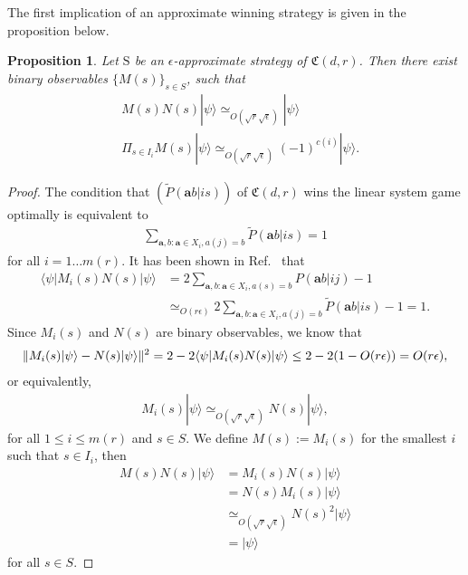 \documentclass[11pt,letterpaper]{article}
\newcommand{\ket}[1]{|#1\rangle}
\newcommand{\bra}[1]{\langle#1|}
\DeclarePairedDelimiter{\norm}{\lVert}{\rVert}
\newcommand{\1}{\mathbb{1}}
\newcommand{\mr}{m(r)}
\newcommand{\fC}{\mathfrak{C}}
\newcommand{\ba}{\pmb{a}}
\newcommand{\bS}{\mathrm{S}}
\newcommand{\pr}[2]{P(#1|#2)}
\newcommand{\tpr}[2]{\tilde{P}(#1|#2)}
\newcommand{\ep}{\epsilon}
\newcommand{\se}{\sqrt{\epsilon}}
\newcommand{\sr}{\sqrt{r}}
\newcommand{\appd}[1]{\simeq_{#1}}
\newtheorem{proposition}[theorem]{Proposition}
\theoremstyle{definition}
\begin{document}
The first implication of an approximate winning strategy is given in the proposition below.
\begin{proposition}
	\label{prop:lct_base}
	Let $\bS$ be an $\ep$-approximate strategy of $\fC(d,r)$.
	Then there exist binary observables $\{ M(s) \}_{s \in S} $, such that
	\begin{align}
		&M(s) N(s) \ket{\psi} \appd{O(\sr\se)} \ket{\psi} \\
		&\Pi_{s \in I_i} M(s) \ket{\psi} \appd{O(\sr\se)}(-1)^{c(i)} \ket{\psi}.
	\end{align}
\end{proposition}
\begin{proof}
The condition that $(\tpr{\ba b}{i s})$ of $\fC(d,r)$ wins the linear system game optimally is equivalent to
\begin{align*}
\sum_{\ba,b: \ba \in X_i, a(j) = b} \tpr{\ba b}{is} = 1
\end{align*}
for all $i = 1 \dots \mr$.
It has been shown in Ref.~\cite{slofstra2017} that 
\begin{align*}
	\bra{\psi} M_i(s) N(s) \ket{\psi} &= 2 \sum_{\ba,b: \ba \in X_i, a(s) = b} \pr{\ba b}{ij} -1 \\
	&\appd{O(r \ep)} 2\sum_{\ba,b: \ba \in X_i, a(j) = b} \tpr{\ba b}{is} - 1 = 1.
\end{align*}
Since $M_i(s)$ and $N(s)$ are binary observables, we know that
\begin{align*}
    \norm{M_i(s)\ket{\psi} - N(s)\ket{\psi}}^2 
    = 2 - 2 \bra{\psi}M_i(s)N(s) \ket{\psi} 
    \leq 2 - 2(1 - O(r\ep)) = O(r\ep),
\end{align*}
or equivalently,
\begin{align*}
	M_{i}(s) \ket{\psi} \appd{O(\sr\se)} N(s) \ket{\psi},
\end{align*}
for all $1 \leq i \leq \mr$ and $s \in S$.
We define $M(s) := M_{i}(s)$ for the smallest $i$ such that $ s \in I_i$, then 
\begin{align*}
	M(s) N(s) \ket{\psi} & = M_{i}(s)N(s)\ket{\psi} \\
	    & = N(s) M_{i}(s) \ket{\psi} \\
	    &\appd{O(\sr\se)} N(s)^2 \ket{\psi} \\
	    &= \ket{\psi}
\end{align*}
for all $s \in S$.


\end{proof}
\end{document}
